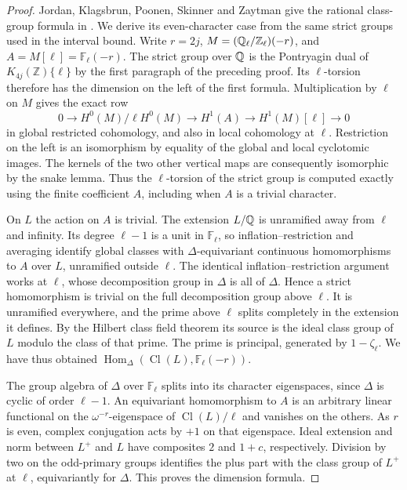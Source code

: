 \documentclass[a4paper,11pt]{article}
\theoremstyle{definition}
\theoremstyle{remark}
\newcommand{\ZZ}{\mathbb Z}\newcommand{\ord}{\operatorname{ord}}
\numberwithin{equation}{section}
\begin{document}
\begin{proof}
Jordan, Klagsbrun, Poonen, Skinner and Zaytman give the rational
class-group formula in \cite[Thm.~5.1]{II-II-I-jkpsz100}. We derive its
even-character case from the same strict groups used in the
interval bound.
Write \(r=2j\), \(M=(\QQ_\ell/\ZZ_\ell)(-r)\),
and \(A=M[\ell]=\mathbb F_\ell(-r)\). The strict group over
\(\mathbb Q\) is the Pontryagin dual of \(K_{4j}(\ZZ)\{\ell\}\) by the
first paragraph of the preceding proof. Its \(\ell\)-torsion
therefore has the dimension on the left of the first formula.
Multiplication by \(\ell\) on \(M\) gives the exact row
\[
 0\longrightarrow H^0(M)/\ell H^0(M)
  \longrightarrow H^1(A)\longrightarrow H^1(M)[\ell]
  \longrightarrow0
\]
in global restricted cohomology, and also in local cohomology
at \(\ell\). Restriction on the left is an isomorphism by equality
of the global and local cyclotomic images. The kernels of the two
other vertical maps are consequently isomorphic by the snake
lemma. Thus the \(\ell\)-torsion of the strict group is computed
exactly using the finite coefficient \(A\), including when \(A\)
is a trivial character.

On \(L\) the action on \(A\) is trivial. The extension \(L/\mathbb Q\)
is unramified away from \(\ell\) and infinity. Its degree
\(\ell-1\) is a unit in \(\mathbb F_\ell\), so
inflation--restriction and averaging identify global classes
with \(\Delta\)-equivariant continuous homomorphisms to \(A\)
over \(L\), unramified outside \(\ell\). The identical
inflation--restriction argument works at \(\ell\), whose
decomposition group in \(\Delta\) is all of \(\Delta\).
Hence a strict homomorphism is trivial on the full decomposition
group above \(\ell\). It is unramified everywhere, and the prime
above \(\ell\) splits completely in the extension it defines.
By the Hilbert class field theorem its source is the ideal class
group of \(L\) modulo the class of that prime. The prime is
principal, generated by \(1-\zeta_\ell\). We have thus obtained
\(\operatorname{Hom}_\Delta(\operatorname{Cl}(L),\mathbb F_\ell(-r))\).

The group algebra of \(\Delta\) over \(\mathbb F_\ell\) splits
into its character eigenspaces, since \(\Delta\) is cyclic of
order \(\ell-1\). An equivariant homomorphism to \(A\) is an
arbitrary linear functional on the \(\omega^{-r}\)-eigenspace of
\(\operatorname{Cl}(L)/\ell\) and vanishes on the others.
As \(r\) is even, complex conjugation acts by \(+1\) on that
eigenspace. Ideal extension and norm between \(L^+\) and \(L\)
have composites \(2\) and \(1+c\), respectively. Division by two
on the odd-primary groups identifies the plus part with the
class group of \(L^+\) at \(\ell\), equivariantly for \(\Delta\).
This proves the dimension formula.


\end{proof}
\end{document}
